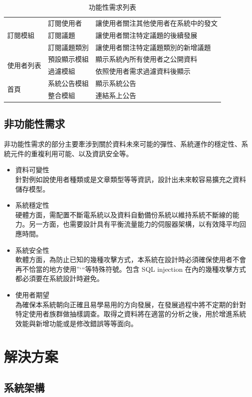\documentclass[11pt]{article}
\begin{document}
\begin{table}[t]
\begin{tabular}{ | l | l | l | }
\multirow{3}{*}{訂閱模組}
& 訂閱使用者 & 讓使用者關注其他使用者在系統中的發文 \\
& 訂閱議題 & 讓使用者關注特定議題的後續發展 \\
& 訂閱議題類別 & 讓使用者關注特定議題類別的新增議題 \\ \hline
\multirow{2}{*}{使用者列表}
& 預設顯示模組 & 顯示系統內所有使用者之公開資料 \\
& 過濾模組 & 依照使用者需求過濾資料後顯示 \\ \hline
\multirow{2}{*}{首頁}
& 系統公告模組 & 顯示系統公告 \\
& 整合模組 & 連結系上公告 \\ \hline
\end{tabular}
\caption{功能性需求列表}
\label{req}
\end{table}

\subsection{非功能性需求}
非功能性需求的部分主要牽涉到關於資料未來可能的彈性、系統運作的穩定性、系統元件的重複利用可能、以及資訊安全等。
\begin{itemize}
\item{資料可變性 \\ 針對例如說使用者種類或是文章類型等等資訊，設計出未來較容易擴充之資料儲存模型。 }
\item{系統穩定性 \\ 硬體方面，需配置不斷電系統以及資料自動備份系統以維持系統不斷線的能力。另一方面，也需要設計具有平衡流量能力的伺服器架構，以有效降平均回應時間。}
\item{系統安全性 \\ 軟體方面，為防止已知的幾種攻擊方式，本系統在設計時必須確保使用者不會再不恰當的地方使用”‘“等特殊符號。包含 SQL injection 在內的幾種攻擊方式都必須要在系統設計時避免。}
\item{使用者期望 \\ 為確保本系統朝向正確且易學易用的方向發展，在發展過程中將不定期的針對特定使用者族群做抽樣調查。取得之資料將在適當的分析之後，用於增進系統效能與新增功能或是修改錯誤等等面向。}
\end{itemize}


\section{解決方案}

\subsection{系統架構}
\end{document}
